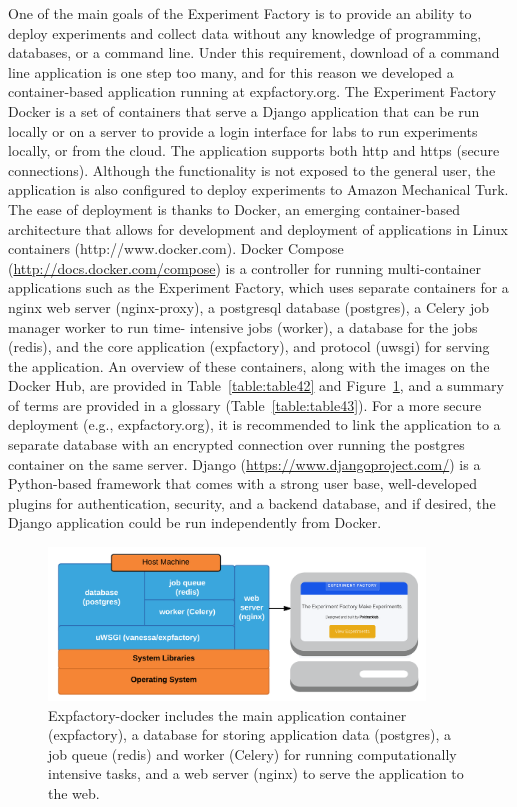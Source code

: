 \documentclass{report}
\begin{document}
One of the main goals of the Experiment Factory is to provide an ability
to deploy experiments and collect data without any knowledge of
programming, databases, or a command line. Under this requirement,
download of a command line application is one step too many, and for
this reason we developed a container-based application running at
expfactory.org. The Experiment Factory Docker is a set of containers
that serve a Django application that can be run locally or on a server
to provide a login interface for labs to run experiments locally, or
from the cloud. The application supports both http and https (secure
connections). Although the functionality is not exposed to the general
user, the application is also configured to deploy experiments to Amazon
Mechanical Turk. The ease of deployment is thanks to Docker, an emerging
container-based architecture that allows for development and deployment
of applications in Linux containers (http://www.docker.com). Docker
Compose (\href{http://docs.docker.com/compose}{http://docs.docker.com/compose}) is a controller for running
multi-container applications such as the Experiment Factory, which uses
separate containers for a nginx web server (nginx-proxy), a postgresql
database (postgres), a Celery job manager worker to run time- intensive
jobs (worker), a database for the jobs (redis), and the core application
(expfactory), and protocol (uwsgi) for serving the application. An
overview of these containers, along with the images on the Docker Hub,
are provided in Table~\ref{table:table42} and Figure~\ref{fig:42}, and a summary of terms are
provided in a glossary (Table~\ref{table:table43}). For a more secure deployment (e.g.,
expfactory.org), it is recommended to link the application to a separate
database with an encrypted connection over running the postgres
container on the same server. Django (\href{https://www.djangoproject.com/}{https://www.djangoproject.com/}) is
a Python-based framework that comes with a strong user base,
well-developed plugins for authentication, security, and a backend
database, and if desired, the Django application could be run
independently from Docker.

\begin{figure}[h!]
\begin{center}
\includegraphics[width=10cm]{images/figure42.png}
\end{center}
\caption{ \label{fig:42} Expfactory-docker includes the main application container (expfactory), a database for storing application data (postgres), a job queue (redis) and worker (Celery) for running computationally intensive tasks, and a web server (nginx) to serve the application to the web. \newline \newline}
\end{figure} 
\end{document}
